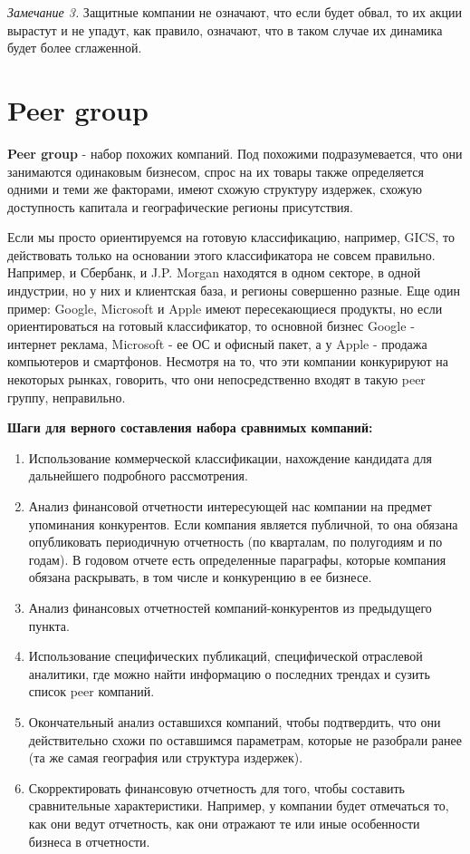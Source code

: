 \documentclass{article}
\begin{document}
	\textit{Замечание 3.} Защитные компании не означают, что если будет обвал, то их акции вырастут и не упадут, как правило, означают, что в таком случае их динамика будет более сглаженной. 
	
	
	\section{Peer group}
	
	\textbf{Peer group} - набор похожих компаний. Под похожими подразумевается, что они занимаются одинаковым бизнесом, спрос на их товары также определяется одними и теми же факторами, имеют схожую структуру издержек, схожую доступность капитала и географические регионы присутствия.

	Если мы просто ориентируемся на готовую классификацию, например, GICS, то действовать только на основании этого классификатора не совсем правильно. Например, и Сбербанк, и J.P. Morgan находятся в одном секторе, в одной индустрии, но у них и клиентская база, и регионы совершенно разные.
	Еще один пример: Google, Microsoft и Apple имеют пересекающиеся продукты, но если ориентироваться на готовый классификатор, то основной бизнес Google - интернет реклама, Microsoft - ее ОС и офисный пакет, а у Apple - продажа компьютеров и смартфонов. Несмотря на то, что эти компании конкурируют на некоторых рынках, говорить, что они непосредственно входят в такую peer группу, неправильно.
	
	\textbf{Шаги для верного составления набора сравнимых компаний:}
	\begin{enumerate}
		\item Использование коммерческой классификации, нахождение кандидата для дальнейшего подробного рассмотрения.
		\item Анализ финансовой отчетности интересующей нас компании на предмет упоминания конкурентов. Если компания является публичной, то она обязана опубликовать периодичную отчетность (по кварталам, по полугодиям и по годам). В годовом отчете есть определенные параграфы, которые компания обязана раскрывать, в том числе и конкуренцию в ее бизнесе.
		\item Анализ финансовых отчетностей компаний-конкурентов из предыдущего пункта.
		\item Использование специфических публикаций, специфической отраслевой аналитики, где можно найти информацию о последних трендах и сузить список peer компаний.
		\item Окончательный анализ оставшихся компаний, чтобы подтвердить, что они действительно схожи по оставшимся параметрам, которые не разобрали ранее (та же самая география или структура издержек).
		\item Скорректировать финансовую отчетность для того, чтобы составить сравнительные характеристики. Например, у компании будет отмечаться то, как они ведут отчетность, как они отражают те или иные особенности бизнеса в отчетности.
	\end{enumerate}
	
\end{document}
